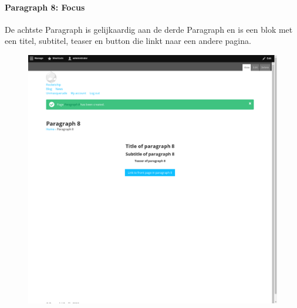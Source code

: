 \paragraph{Paragraph 8: Focus}
De achtste Paragraph is gelijkaardig aan de derde Paragraph en is een blok met een titel, subtitel, teaser en button die linkt naar een andere pagina.
\begin{figure}[h]
\includegraphics[width=1\textwidth]{img/p008.png}
\end{figure}

\clearpage
